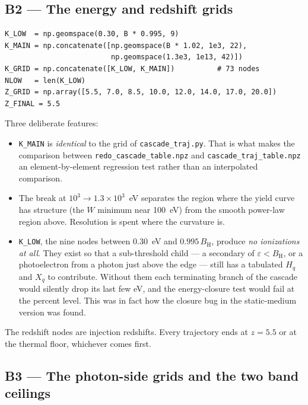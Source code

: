 \documentclass[11pt,a4paper]{article}
\newcommand{\code}[1]{\texttt{\small #1}}
\newcommand{\file}[1]{\texttt{\small #1}}
\newcommand{\eps}{\varepsilon}
\newcommand{\BH}{B_{\mathrm{H}}}
\begin{document}
\subsection*{B2 --- The energy and redshift grids}

\begin{lstlisting}
K_LOW  = np.geomspace(0.30, B * 0.995, 9)
K_MAIN = np.concatenate([np.geomspace(B * 1.02, 1e3, 22),
                         np.geomspace(1.3e3, 1e13, 42)])
K_GRID = np.concatenate([K_LOW, K_MAIN])          # 73 nodes
NLOW   = len(K_LOW)
Z_GRID = np.array([5.5, 7.0, 8.5, 10.0, 12.0, 14.0, 17.0, 20.0])
Z_FINAL = 5.5
\end{lstlisting}

Three deliberate features:

\begin{itemize}[leftmargin=1.3em]
\item \code{K\_MAIN} is \emph{identical} to the grid of \file{cascade\_traj.py}.
      That is what makes the comparison between \code{redo\_cascade\_table.npz}
      and \code{cascade\_traj\_table.npz} an element-by-element regression test
      rather than an interpolated comparison.
\item The break at $10^3\to1.3\times10^3$~eV separates the region where the
      yield curve has structure (the $W$ minimum near 100~eV) from the smooth
      power-law region above.  Resolution is spent where the curvature is.
\item \code{K\_LOW}, the nine nodes between 0.30~eV and $0.995\,\BH$, produce
      \emph{no ionizations at all}.  They exist so that a sub-threshold child
      --- a secondary of $\eps<\BH$, or a photoelectron from a photon just above
      the edge --- still has a tabulated $H_q$ and $X_q$ to contribute.  Without
      them each terminating branch of the cascade would silently drop its last
      few eV, and the energy-closure test would fail at the percent level.  This
      was in fact how the closure bug in the static-medium version was found.
\end{itemize}

The redshift nodes are injection redshifts.  Every trajectory ends at
$z=5.5$ or at the thermal floor, whichever comes first.

\subsection*{B3 --- The photon-side grids and the two band ceilings}
\end{document}
